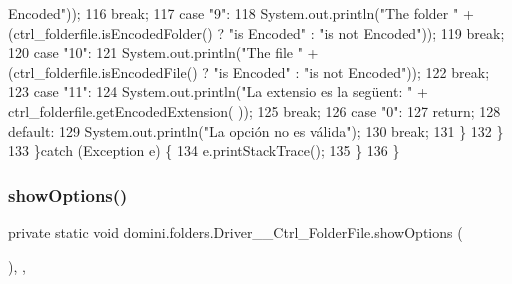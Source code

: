 \begin{DoxyCode}
{       Encoded"}));
116                 \textcolor{keywordflow}{break};
117                 \textcolor{keywordflow}{case} \textcolor{stringliteral}{"9"}:
118                     System.out.println(\textcolor{stringliteral}{"The folder "} + (ctrl\_folderfile.isEncodedFolder() ? \textcolor{stringliteral}{"is Encoded"} : \textcolor{stringliteral}{
      "is not Encoded"}));
119                 \textcolor{keywordflow}{break};
120                 \textcolor{keywordflow}{case} \textcolor{stringliteral}{"10"}:
121                     System.out.println(\textcolor{stringliteral}{"The file "} + (ctrl\_folderfile.isEncodedFile() ? \textcolor{stringliteral}{"is Encoded"} : \textcolor{stringliteral}{"is
       not Encoded"}));
122                 \textcolor{keywordflow}{break};
123                 \textcolor{keywordflow}{case} \textcolor{stringliteral}{"11"}:
124                     System.out.println(\textcolor{stringliteral}{"La extensio es la següent: "} + ctrl\_folderfile.getEncodedExtension(
      ));
125                 \textcolor{keywordflow}{break};
126                 \textcolor{keywordflow}{case} \textcolor{stringliteral}{"0"}:
127                     \textcolor{keywordflow}{return};
128                 \textcolor{keywordflow}{default}:
129                     System.out.println(\textcolor{stringliteral}{"La opción no es válida"});
130                 \textcolor{keywordflow}{break};
131             \}
132         \}
133     \}\textcolor{keywordflow}{catch} (Exception e) \{
134         e.printStackTrace();
135     \}
136     \}
\end{DoxyCode}
\mbox{\label{classdomini_1_1folders_1_1Driver____Ctrl__FolderFile_a5343134690950988d119d5e124edb1b4}} 
\subsubsection{\texorpdfstring{show\+Options()}{showOptions()}}
{\footnotesize\ttfamily private static void domini.\+folders.\+Driver\+\_\+\+\_\+\+Ctrl\+\_\+\+Folder\+File.\+show\+Options (\begin{DoxyParamCaption}{ }\end{DoxyParamCaption})\hspace{0.3cm}{\ttfamily [inline]}, {\ttfamily [static]}, {\ttfamily [private]}}



